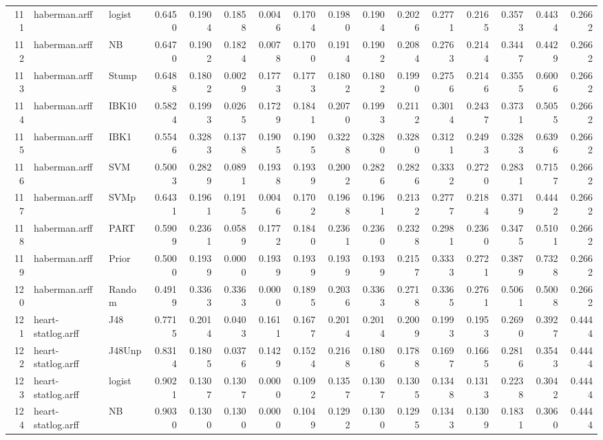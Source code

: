 \documentclass {article}
\begin{document}
\begin{table}[ht]
\begin{tabular}{rllrrrrrrrrrrrrr}
  111 & haberman.arff & logist & 0.6450 & 0.1904 & 0.1858 & 0.0046 & 0.1704 & 0.1980 & 0.1904 & 0.2026 & 0.2771 & 0.2165 & 0.3573 & 0.4434 & 0.2662 \\ 
  112 & haberman.arff & NB & 0.6470 & 0.1902 & 0.1824 & 0.0078 & 0.1700 & 0.1914 & 0.1902 & 0.2084 & 0.2763 & 0.2144 & 0.3447 & 0.4429 & 0.2662 \\ 
  113 & haberman.arff & Stump & 0.6488 & 0.1802 & 0.0029 & 0.1773 & 0.1773 & 0.1802 & 0.1802 & 0.1990 & 0.2756 & 0.2146 & 0.3555 & 0.6006 & 0.2662 \\ 
  114 & haberman.arff & IBK10 & 0.5824 & 0.1993 & 0.0265 & 0.1729 & 0.1841 & 0.2070 & 0.1993 & 0.2112 & 0.3014 & 0.2437 & 0.3731 & 0.5055 & 0.2662 \\ 
  115 & haberman.arff & IBK1 & 0.5546 & 0.3283 & 0.1378 & 0.1905 & 0.1905 & 0.3228 & 0.3280 & 0.3280 & 0.3121 & 0.2493 & 0.3283 & 0.6396 & 0.2662 \\ 
  116 & haberman.arff & SVM & 0.5003 & 0.2829 & 0.0891 & 0.1938 & 0.1939 & 0.2002 & 0.2826 & 0.2826 & 0.3332 & 0.2720 & 0.2831 & 0.7157 & 0.2662 \\ 
  117 & haberman.arff & SVMp & 0.6431 & 0.1961 & 0.1915 & 0.0046 & 0.1702 & 0.1968 & 0.1961 & 0.2132 & 0.2777 & 0.2184 & 0.3719 & 0.4442 & 0.2662 \\ 
  118 & haberman.arff & PART & 0.5909 & 0.2361 & 0.0589 & 0.1772 & 0.1840 & 0.2361 & 0.2360 & 0.2328 & 0.2981 & 0.2360 & 0.3475 & 0.5101 & 0.2662 \\ 
  119 & haberman.arff & Prior & 0.5000 & 0.1939 & 0.0000 & 0.1939 & 0.1939 & 0.1939 & 0.1939 & 0.2157 & 0.3333 & 0.2721 & 0.3879 & 0.7328 & 0.2662 \\ 
  120 & haberman.arff & Random & 0.4919 & 0.3363 & 0.3363 & 0.0000 & 0.1895 & 0.2036 & 0.3363 & 0.2718 & 0.3365 & 0.2761 & 0.5061 & 0.5008 & 0.2662 \\ 
  121 & heart-statlog.arff & J48 & 0.7715 & 0.2014 & 0.0403 & 0.1611 & 0.1677 & 0.2014 & 0.2014 & 0.2009 & 0.1993 & 0.1953 & 0.2690 & 0.3927 & 0.4444 \\ 
  122 & heart-statlog.arff & J48Unp & 0.8314 & 0.1805 & 0.0376 & 0.1429 & 0.1524 & 0.2168 & 0.1806 & 0.1788 & 0.1697 & 0.1665 & 0.2816 & 0.3543 & 0.4444 \\ 
  123 & heart-statlog.arff & logist & 0.9021 & 0.1307 & 0.1307 & 0.0000 & 0.1092 & 0.1357 & 0.1307 & 0.1305 & 0.1348 & 0.1313 & 0.2238 & 0.3042 & 0.4444 \\ 
  124 & heart-statlog.arff & NB & 0.9030 & 0.1300 & 0.1300 & 0.0000 & 0.1049 & 0.1292 & 0.1300 & 0.1295 & 0.1343 & 0.1309 & 0.1831 & 0.3060 & 0.4444 \\ 

\end{tabular}
\end{table}
\end{document}
